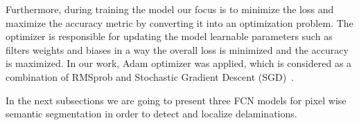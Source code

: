 	Furthermore, during training the model our focus is to minimize the loss and maximize the accuracy metric by converting it into an optimization problem. 
	The optimizer is responsible for updating the model learnable parameters such as filters weights and biases in a way the overall loss is minimized and the accuracy is maximized.
	In our work, Adam optimizer was applied, which is considered as a combination of RMSprob and Stochastic Gradient Descent (SGD)~\cite{Kingma2015}. 

	In the next subsections we are going to present three FCN models for pixel wise semantic segmentation in order to detect and localize delaminations.
